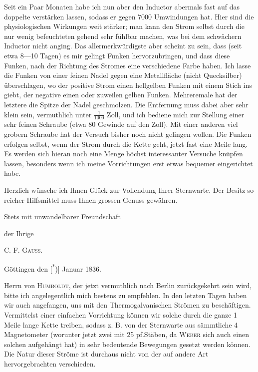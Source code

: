 Seit ein Paar Monaten habe ich nun aber den Inductor abermals fast
auf das doppelte verstärken lassen, sodass er gegen 7000 Umwindungen hat.
Hier sind die physiologischen Wirkungen weit stärker; man kann den Strom
selbst durch die nur wenig befeuchteten  gehend sehr fühlbar machen,
was bei dem schwächern Inductor nicht anging. Das allermerkwürdigste
\clearpage{}
\noindent aber scheint zu sein, dass (seit etwa 8—10 Tagen) es mir gelingt Funken
hervorzubringen, und dass diese Funken, nach der Richtung des Stromes eine
verschiedene Farbe haben. Ich lasse die Funken von einer feinen Nadel
gegen eine  Metallfläche (nicht Quecksilber) überschlagen, wo der positive
Strom einen hellgelben Funken mit einem Stich ins  giebt, der negative
einen  oder zuweilen gelben Funken. Mehreremale hat der letztere
die Spitze der Nadel geschmolzen. Die Entfernung muss dabei aber sehr
klein sein, vermuthlich unter \(\frac{1}{1000}\) Zoll, und ich bediene mich zur Stellung
einer sehr feinen Schraube (etwa 80 Gewinde auf den Zoll). Mit einer anderen
viel grobern Schraube hat der Versuch bisher noch nicht gelingen wollen.
Die Funken erfolgen selbst, wenn der Strom durch die  Kette geht,
jetzt fast eine Meile lang. Es werden sich hieran noch eine Menge höchst
interessanter Versuche knüpfen lassen, besonders wenn ich meine Vorrichtungen
erst etwas bequemer eingerichtet habe.

Herzlich wünsche ich Ihnen Glück zur Vollendung Ihrer Sternwarte. Der
Besitz so reicher Hilfsmittel muss Ihnen grossen Genuss gewähren.

Stets mit unwandelbarer Freundschaft
\begin{flushright}der Ihrige\par\medskip C. F. \textsc{Gauss}.\end{flushright}
\par\indent Göttingen den [\textsuperscript{*})] Januar 1836.\begingroup\renewcommand{\thefootnote}{}
\endgroup\par
\indent Herrn von \textsc{Humboldt}, der jetzt vermuthlich nach Berlin zurückgekehrt
sein wird, bitte ich angelegentlich mich bestens zu empfehlen. In den letzten
Tagen haben wir auch angefangen, uns mit den Thermogalvanischen Strömen
zu beschäftigen. Vermittelst einer einfachen Vorrichtung können wir solche
durch die ganze 1 Meile lange Kette treiben, sodass z. B. von der Sternwarte
aus sämmtliche 4 Magnetometer (worunter jetzt zwei mit 25 pf.Stäben, da
\textsc{Weber} sich auch einen solchen aufgehängt hat) in sehr bedeutende Bewegungen
gesetzt werden können. Die Natur dieser Ströme ist durchaus nicht
von der auf andere Art hervorgebrachten verschieden.
\clearpage\endgroup
